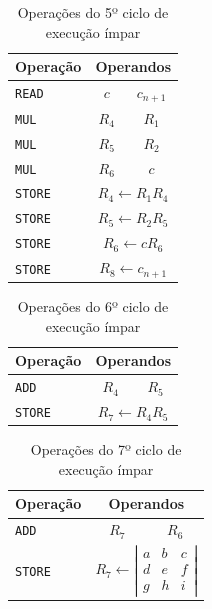 \begin{multicols}{2}
	\begin{table}[H]
		\centering
		\begin{tabular}{l|c|c}
			Operação & \multicolumn{2}{c}{Operandos} \\
			\hline
			\texttt{READ} & $c$ & $c_{n+1}$ \\
			\hline
			\texttt{MUL} & $R_4$ & $R_1$ \\
			\texttt{MUL} & $R_5$ & $R_2$ \\
			\texttt{MUL} & $R_6$ & $c$ \\
			\hline
			\texttt{STORE} & \multicolumn{2}{c}{$R_4\leftarrow R_1R_4$} \\
			\texttt{STORE} & \multicolumn{2}{c}{$R_5\leftarrow R_2R_5$} \\
			\texttt{STORE} & \multicolumn{2}{c}{$R_6\leftarrow c R_6$} \\
			\texttt{STORE} & \multicolumn{2}{c}{$R_8\leftarrow c_{n+1}$} \\
		\end{tabular}
		\caption{Operações do 5º ciclo de execução ímpar}
		\label{tab:odd_5}
	\end{table}

	\begin{table}[H]
		\centering
		\begin{tabular}{l|c|c}
			Operação & \multicolumn{2}{c}{Operandos} \\
			\hline
			\texttt{ADD} & $R_4$ & $R_5$ \\
			\hline
			\texttt{STORE} &\multicolumn{2}{c}{$R_7\leftarrow R_4R_5$} \\
		\end{tabular}
		\caption{Operações do 6º ciclo de execução ímpar}
		\label{tab:odd_6}
	\end{table}

	\begin{table}[H]
		\centering
		\begin{tabular}{l|c|c}
			Operação & \multicolumn{2}{c}{Operandos} \\
			\hline
			\texttt{ADD} & $R_7$ & $R_6$ \\
			\hline
			\texttt{STORE} &\multicolumn{2}{c}{$R_7\leftarrow \left|\begin{matrix}a&b&c\\d&e&f\\g&h&i\end{matrix}\right|$} \\
		\end{tabular}
		\caption{Operações do 7º ciclo de execução ímpar}
		\label{tab:odd_7}
	\end{table}


\end{multicols}
